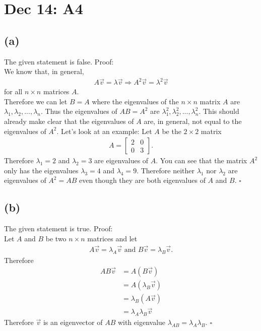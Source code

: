 \documentclass{article}
\begin{document}
\section*{Dec 14: A4}
\subsection*{(a)}
The given statement is false. Proof:\\
We know that, in general, 
\begin{align*}
    A\vec v = \lambda\vec v \Rightarrow A^2\vec v = \lambda^2\vec v
\end{align*}
for all $n\times n$ matrices $A$.\\
Therefore we can let $B=A$ where the eigenvalues of the $n\times n$ matrix $A$ are $\lambda_1, \lambda_2, ..., \lambda_n$.
Thus the eigenvalues of $AB=A^2$ are $\lambda_1^2, \lambda_2^2, ..., \lambda_n^2$. This should already make clear that the eigenvalues of $A$ are, in general, not equal to the eigenvalues of $A^2$. Let's look at an example:
Let $A$ be the $2\times2$ matrix
\begin{align*}
    A = \begin{bmatrix}
        2 &0\\ 0& 3
    \end{bmatrix}.
\end{align*}
Therefore $\lambda_1=2$ and $\lambda_2=3$ are eigenvalues of $A$. You can see that the matrix $A^2$ only has the eigenvalues $\lambda_3=4$ and $\lambda_4=9$. Therefore neither $\lambda_1$ nor $\lambda_2$ are eigenvalues of $A^2=AB$ even though they are both eigenvalues of $A$ and $B$. $\square$
\subsection*{(b)}
The given statement is true. Proof:\\
Let $A$ and $B$ be two $n\times n$ matrices and let
\begin{align*}
    A\vec v =\lambda_A \vec v \text{  and  } B\vec v =\lambda_B\vec v.
\end{align*}
Therefore
\begin{align*}
    AB\vec v &= A(B\vec v)\\
    &= A(\lambda_B\vec v)\\
    &= \lambda_B(A\vec v)\\
    &=\lambda_A\lambda_B\vec v
\end{align*}
Therefore $\vec v$ is an eigenvector of $AB$ with eigenvalue $\lambda_{AB}=\lambda_A\lambda_B$. $\square$
\end{document}
